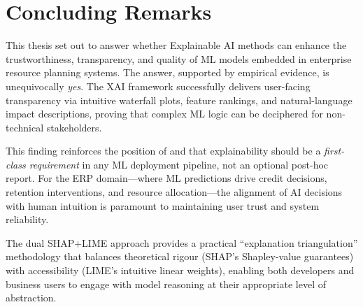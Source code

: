 \documentclass[12pt,a4paper]{report}
\begin{document}
\section{Concluding Remarks}
\label{sec:concluding}

This thesis set out to answer whether Explainable AI methods can enhance the trustworthiness, transparency, and quality of ML models embedded in enterprise resource planning systems. The answer, supported by empirical evidence, is unequivocally \textit{yes}. The XAI framework successfully delivers user-facing transparency via intuitive waterfall plots, feature rankings, and natural-language impact descriptions, proving that complex ML logic can be deciphered for non-technical stakeholders.

This finding reinforces the position of \citet{lundberg2020local} and \citet{rudin2019stop} that explainability should be a \textit{first-class requirement} in any ML deployment pipeline, not an optional post-hoc report. For the ERP domain---where ML predictions drive credit decisions, retention interventions, and resource allocation---the alignment of AI decisions with human intuition is paramount to maintaining user trust and system reliability.

The dual SHAP+LIME approach provides a practical ``explanation triangulation'' methodology that balances theoretical rigour (SHAP's Shapley-value guarantees) with accessibility (LIME's intuitive linear weights), enabling both developers and business users to engage with model reasoning at their appropriate level of abstraction.




\end{document}
